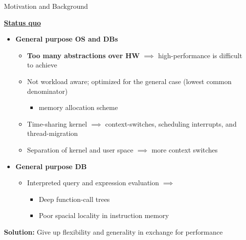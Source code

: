 \begin{block}{Motivation and Background}

\underline{\textbf{Status quo}}
  \begin{itemize}
  \item \textbf{General purpose OS and DBs}%
    \begin{itemize}
     \item \textbf{Too many abstractions over HW} $\implies$ high-performance is difficult
      to achieve~\cite{GICEVA:2016:OS_SUPPORT,HALE:2015:NAUTILUS}
    \item Not workload aware; optimized for the general case (lowest common denominator)
      \begin{itemize}
      \item memory allocation scheme
      \end{itemize}
    \item Time-sharing kernel $\implies$ context-switches, scheduling interrupts, and thread-migration
    \item Separation of kernel and user space $\implies$ more context switches
    \end{itemize}
  \item \textbf{General purpose DB}
    \begin{itemize}
    \item Interpreted query and expression evaluation  $\implies$
      \begin{itemize}
      \item Deep function-call trees
      \item Poor spacial locality in instruction memory
    \end{itemize}
    \end{itemize}
  \end{itemize}

  \begin{center}
    \alert{\textbf{Solution:} Give up flexibility and generality in exchange for performance}
  \end{center}
   

\end{block}

